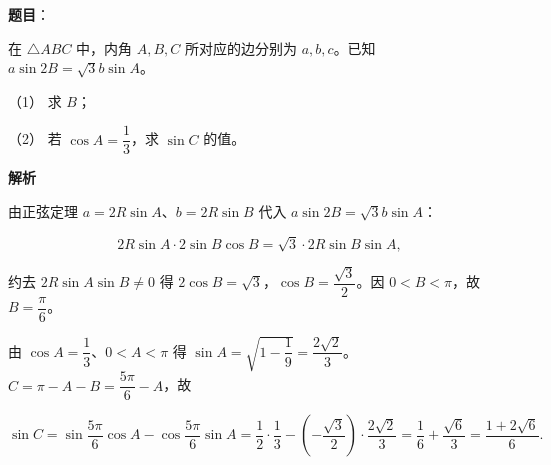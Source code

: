 \begin{answer}

\textbf{题目}：

在 \(\triangle ABC\) 中，内角 \(A,B,C\) 所对应的边分别为 \(a,b,c\)。已知 \(a\sin 2B=\sqrt{3}b\sin A\)。

（1） 求 \(B\)；

（2） 若 \(\cos A=\dfrac{1}{3}\)，求 \(\sin C\) 的值。

\textbf{解析}


由正弦定理 \(a=2R\sin A\)、\(b=2R\sin B\) 代入 \(a\sin 2B=\sqrt{3}b\sin A\)：

\nopagebreak[4]
\[
2R\sin A\cdot 2\sin B\cos B=\sqrt{3}\cdot 2R\sin B\sin A,
\]

约去 \(2R\sin A\sin B\neq 0\) 得 \(2\cos B=\sqrt{3}\)，\(\cos B=\dfrac{\sqrt{3}}{2}\)。因 \(0<B<\pi\)，故 \(B=\dfrac{\pi}{6}\)。


由 \(\cos A=\dfrac{1}{3}\)、\(0<A<\pi\) 得 \(\sin A=\sqrt{1-\dfrac{1}{9}}=\dfrac{2\sqrt{2}}{3}\)。\(C=\pi-A-B=\dfrac{5\pi}{6}-A\)，故

\nopagebreak[4]
\[
\sin C=\sin\dfrac{5\pi}{6}\cos A-\cos\dfrac{5\pi}{6}\sin A=\dfrac{1}{2}\cdot\dfrac{1}{3}-\left(-\dfrac{\sqrt{3}}{2}\right)\cdot\dfrac{2\sqrt{2}}{3}=\dfrac{1}{6}+\dfrac{\sqrt{6}}{3}=\dfrac{1+2\sqrt{6}}{6}.
\]



\end{answer}
